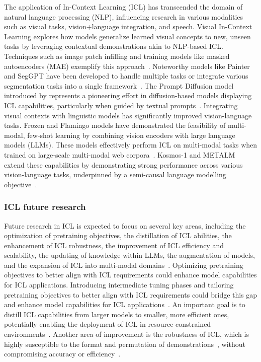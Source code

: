 The application of In-Context Learning (ICL) has transcended the domain of natural language processing (NLP), influencing research in various modalities such as visual tasks, vision+language integration, and speech.
Visual In-Context Learning explores how models generalize learned visual concepts to new, unseen tasks by leveraging contextual demonstrations akin to NLP-based ICL. Techniques such as image patch infilling and training models like masked autoencoders (MAE) exemplify this approach~\cite{bar2022visual}.
Noteworthy models like Painter and SegGPT have been developed to handle multiple tasks or integrate various segmentation tasks into a single framework~\cite{wang2023images, wang2023seggpt}.
The Prompt Diffusion model introduced by \textcite{wang2023incontext} represents a pioneering effort in diffusion-based models displaying ICL capabilities, particularly when guided by textual prompts~\cite{wang2023incontext}.
Integrating visual contexts with linguistic models has significantly improved vision-language tasks.
Frozen and Flamingo models have demonstrated the feasibility of multi-modal, few-shot learning by combining vision encoders with large language models (LLMs).
These models effectively perform ICL on multi-modal tasks when trained on large-scale multi-modal web corpora~\cite{tsimpoukelli2021frozen, alayrac2022flamingo}.
Kosmos-1 and METALM extend these capabilities by demonstrating strong performance across various vision-language tasks, underpinned by a semi-causal language modelling objective~\cite{huang2023language, hao2022language}.

\subsubsection{ICL future research}
\label{subsec:icl-future}

Future research in ICL is expected to focus on several key areas, including the optimization of pretraining objectives, the distillation of ICL abilities, the enhancement of ICL robustness, the improvement of ICL efficiency and scalability, the updating of knowledge within LLMs, the augmentation of models, and the expansion of ICL into multi-modal domains~\cite{dong2023survey}.
Optimizing pretraining objectives to better align with ICL requirements could enhance model capabilities for ICL applications.
Introducing intermediate tuning phases and tailoring pretraining objectives to better align with ICL requirements could bridge this gap and enhance model capabilities for ICL applications~\cite{shin2022effect}.
An important goal is to distill ICL capabilities from larger models to smaller, more efficient ones, potentially enabling the deployment of ICL in resource-constrained environments~\cite{magister2022teaching}.
Another area of improvement is the robustness of ICL, which is highly susceptible to the format and permutation of demonstrations~\cite{zhao2021calibrate, lu2022fantastically}, without compromising accuracy or efficiency~\cite{chen2024relation}.

